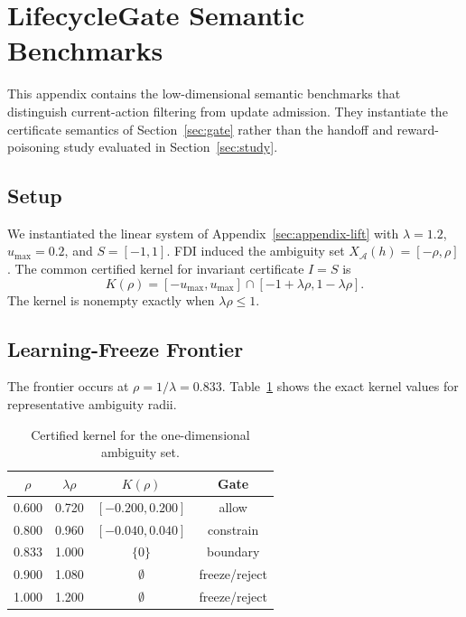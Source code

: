 \section{LifecycleGate Semantic Benchmarks}
\label{sec:appendix-benchmarks}

This appendix contains the low-dimensional semantic benchmarks that
distinguish current-action filtering from update admission.  They instantiate
the certificate semantics of Section~\ref{sec:gate} rather than the handoff and
reward-poisoning study evaluated in Section~\ref{sec:study}.

\subsection{Setup}

We instantiated the linear system of Appendix~\ref{sec:appendix-lift} with
$\lambda=1.2$,
$u_{\max}=0.2$, and $S=[-1,1]$.  FDI induced the ambiguity set
$X_{\mathcal A}(h)=[-\rho,\rho]$.  The common certified kernel for invariant
certificate $I=S$ is
\begin{equation}
    K(\rho)=[-u_{\max},u_{\max}]\cap[-1+\lambda\rho,1-\lambda\rho].
\end{equation}
The kernel is nonempty exactly when $\lambda\rho\le 1$.

\subsection{Learning-Freeze Frontier}

The frontier occurs at $\rho=1/\lambda=0.833$. Table~\ref{tab:frontier} shows the exact kernel values for representative ambiguity radii.

\begin{table}[t]
\centering
\caption{Certified kernel for the one-dimensional ambiguity set.}
\label{tab:frontier}
\begin{tabular}{cccc}
\toprule
$\rho$ & $\lambda\rho$ & $K(\rho)$ & Gate \\
\midrule
0.600 & 0.720 & $[-0.200,0.200]$ & allow \\
0.800 & 0.960 & $[-0.040,0.040]$ & constrain \\
0.833 & 1.000 & $\{0\}$ & boundary \\
0.900 & 1.080 & $\emptyset$ & freeze/reject \\
1.000 & 1.200 & $\emptyset$ & freeze/reject \\
\bottomrule
\end{tabular}
\end{table}

